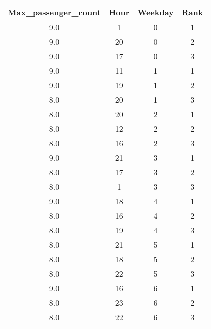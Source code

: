 \begin{tabular}{|c|c|c|c|}
\hline
Max\_passenger\_count&Hour&Weekday&Rank \\ 
\hline
\hline
9.0&1&0&1 \\ 
\hline
9.0&20&0&2 \\ 
\hline
9.0&17&0&3 \\ 
\hline
9.0&11&1&1 \\ 
\hline
9.0&19&1&2 \\ 
\hline
8.0&20&1&3 \\ 
\hline
8.0&20&2&1 \\ 
\hline
8.0&12&2&2 \\ 
\hline
8.0&16&2&3 \\ 
\hline
9.0&21&3&1 \\ 
\hline
8.0&17&3&2 \\ 
\hline
8.0&1&3&3 \\ 
\hline
9.0&18&4&1 \\ 
\hline
8.0&16&4&2 \\ 
\hline
8.0&19&4&3 \\ 
\hline
8.0&21&5&1 \\ 
\hline
8.0&18&5&2 \\ 
\hline
8.0&22&5&3 \\ 
\hline
9.0&16&6&1 \\ 
\hline
8.0&23&6&2 \\ 
\hline
8.0&22&6&3 \\ 
\hline
\end{tabular}